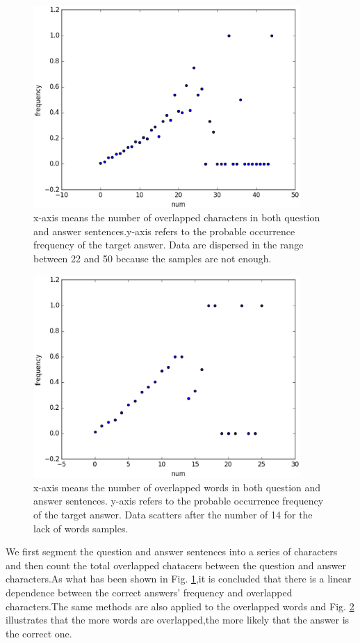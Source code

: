 \documentclass{llncs}
\begin{document}
\begin{figure}[htb]
\centering
\includegraphics[width=4in]{figures/character_overlap.eps}
\caption{x-axis means the number of overlapped characters in both question and answer sentences.y-axis refers to the probable occurrence frequency of the target answer. Data are dispersed in the range between 22 and 50 because the samples are not enough.}
\label{fig:character_overlap}
\end{figure}


\begin{figure}
\centering
\includegraphics[width=4in]{figures/word_overlap.eps}
\caption{x-axis means the number of overlapped words in both question and answer sentences. y-axis refers to the probable occurrence frequency of the target answer. Data scatters after the number of 14 for the lack of words samples.}
\label{fig:word_overlap}
\end{figure}

We first segment the question and answer sentences into a series of characters and then count the total overlapped chatacers between the question and answer characters.As what has been shown in Fig. \ref{fig:character_overlap},it is concluded that there is a linear dependence between the correct answers’ frequency and overlapped characters.The same methods are also applied to the overlapped words and Fig. \ref{fig:word_overlap} illustrates that the more words are overlapped,the more likely that the answer is the correct one.
\end{document}
